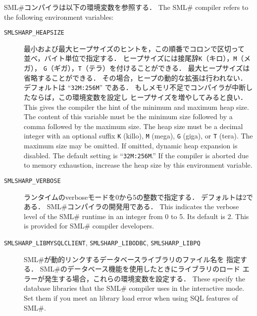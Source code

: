 \documentclass{jbook}
\newcommand{\smlsharp}{SML\#}
\begin{document}
\ifjp%
	\smlsharp{}コンパイラは以下の環境変数を参照する．
\else%
        The \smlsharp{} compiler refers to the following environment
variables:
\fi%

\begin{description}
\item[{\tt SMLSHARP\_HEAPSIZE}]
\ifjp%
	最小および最大ヒープサイズのヒントを，この順番でコロンで区切って
並べ，バイト単位で指定する．
	ヒープサイズには接尾辞{\tt K}（キロ），{\tt M}（メガ），
{\tt G}（ギガ），{\tt T}（テラ）を付けることができる．
	最大ヒープサイズは省略することができる．
	その場合，ヒープの動的な拡張は行われない．
	デフォルトは ``{\tt 32M:256M}'' である．
	もしメモリ不足でコンパイラが中断したならば，この環境変数を設定し
ヒープサイズを増やしてみると良い．
\else%
	This gives the compiler the hint of the minimum and maximum heap
size.
        The content of this variable must be the minimum size followed
by a comma followed by the maximum size.
	The heap size must be a decimal integer with an optional suffix
{\tt K} (killo), {\tt M} (mega), {\tt G} (giga), or {\tt T} (tera).
	The maximum size may be omitted.
	If omitted, dynamic heap expansion is disabled.
        The default setting is ``{\tt 32M:256M}.''
	If the compiler is aborted due to memory exhaustion,
increase the heap size by this environment variable.
\fi%

\item[{\tt SMLSHARP\_VERBOSE}]
\ifjp%
	ランタイムのverboseモードを0から5の整数で指定する．
	デフォルトは2である．
	\smlsharp{}コンパイラの開発用である．
\else%
	This indicates the verbose level of the \smlsharp{} runtime
in an integer from 0 to 5.
	Its default is 2.
	This is provided for \smlsharp{} compiler developers.
\fi%

\item[{\tt SMLSHARP\_LIBMYSQLCLIENT},
      {\tt SMLSHARP\_LIBODBC},
      {\tt SMLSHARP\_LIBPQ}]
\ifjp%
	\smlsharp{}が動的リンクするデータベースライブラリのファイル名を
指定する．
	\smlsharp{}のデータベース機能を使用したときにライブラリのロード
エラーが発生する場合，これらの環境変数を設定する．
\else%
	These specify the database libraries that the \smlsharp{} compiler
uses in the interactive mode.
	Set them if you meet an library load error when using SQL features
of \smlsharp{}.
\fi%

\end{description}
\end{document}
